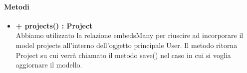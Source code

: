 	\paragraph{Metodi}
	\begin{itemize}
		\item \textbf{+ projects() : Project}\\
		Abbiamo utilizzato la relazione embedsMany per riuscire ad incorporare il model projects all'interno dell'oggetto principale User. Il metodo ritorna Project su cui verrà chiamato il metodo save() nel caso in cui si voglia aggiornare il modello.
	\end{itemize}